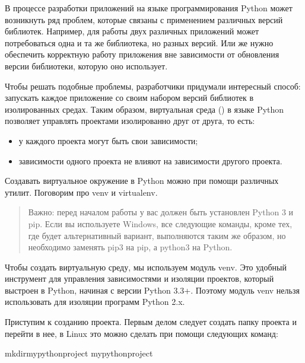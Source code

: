 \documentclass[letterpaper,10pt,russian]{sphinxmanual}
\begin{document}
\sphinxAtStartPar
В процессе разработки приложений на языке программирования Python может возникнуть ряд проблем, которые связаны с применением различных версий библиотек. Например, для работы двух различных приложений может потребоваться одна и та же библиотека, но разных версий. Или же нужно обеспечить корректную работу приложения вне зависимости от обновления версии библиотеки, которую оно использует.

\sphinxAtStartPar
Чтобы решать подобные проблемы, разработчики придумали интересный способ: запускать каждое приложение со своим набором версий библиотек в изолированных средах. Таким образом, виртуальная среда () в языке Python позволяет управлять проектами изолированно друг от друга, то есть:
\begin{itemize}
\item {} 
\sphinxAtStartPar
у каждого проекта могут быть свои зависимости;

\item {} 
\sphinxAtStartPar
зависимости одного проекта не влияют на зависимости другого проекта.

\end{itemize}

\sphinxAtStartPar
Создавать виртуальное окружение в Python можно при помощи различных утилит. Поговорим про venv и virtualenv.
\begin{quote}

\sphinxAtStartPar
Важно: перед началом работы у вас должен быть установлен Python 3 и pip. Если вы используете Windows, все следующие команды, кроме тех, где будет альтернативный вариант, выполняются таким же образом, но необходимо заменять pip3 на pip, а python3 на Python.
\end{quote}

\sphinxAtStartPar
{}

\sphinxAtStartPar
Чтобы создать виртуальную среду, мы используем модуль venv. Это удобный инструмент для управления зависимостями и изоляции проектов, который выстроен в Python, начиная с версии Python 3.3+. Поэтому модуль venv нельзя использовать для изоляции программ Python 2.x.

\sphinxAtStartPar
{}

\sphinxAtStartPar
Приступим к созданию проекта. Первым делом следует создать папку проекта и перейти в нее, в Linux это можно сделать при помощи следующих команд:

\begin{sphinxVerbatim}[commandchars=\\\{\}]
\PYGZdl{}mkdirmy\PYGZus{}python\PYGZus{}project
my\PYGZus{}python\PYGZus{}project
\end{sphinxVerbatim}
\end{document}
